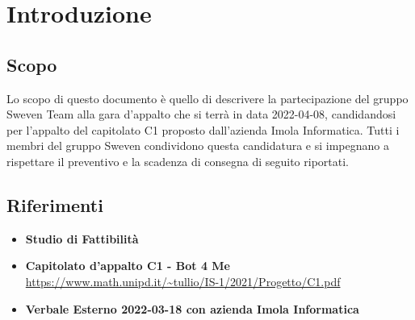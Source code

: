 \section{Introduzione}
\subsection{Scopo}
    Lo scopo di questo documento è quello di descrivere la partecipazione del gruppo Sweven Team 
    alla gara d'appalto che si terrà in data 2022-04-08, 
    candidandosi per l'appalto del capitolato C1 proposto dall'azienda Imola Informatica.
    \newline
    Tutti i membri del gruppo Sweven condividono questa candidatura e si impegnano a 
    rispettare il preventivo e la scadenza di consegna di seguito riportati.
\subsection{Riferimenti}
\begin{itemize}
    \item \textbf{Studio di Fattibilità}
    \item \textbf{Capitolato d'appalto C1 - Bot 4 Me}\newline
	\url{https://www.math.unipd.it/~tullio/IS-1/2021/Progetto/C1.pdf}
	\item \textbf{Verbale Esterno 2022-03-18 con azienda Imola Informatica}
\end{itemize}